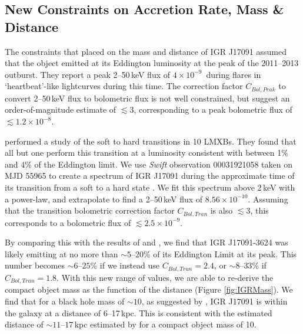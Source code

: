 \subsection{New Constraints on Accretion Rate, Mass \& Distance}
\label{sec:newmass}

\par The constraints that \citealp{Altamirano_IGR_FH} placed on the mass and distance of IGR J17091 assumed that the object emitted at its Eddington luminosity at the peak of the 2011--2013 outburst.  They report a peak 2--50\,keV flux of $4\times10^{-9}$\ergf\ during flares in `heartbeat'-like lightcurves during this time.  The correction factor $C_{Bol,Peak}$ to convert 2--50\,keV flux to bolometric flux is not well constrained, but \citealp{Altamirano_IGR_FH} suggest an order-of-magnitude estimate of $\lesssim3$, corresponding to a peak bolometric flux of $\lesssim1.2\times10^{-8}$\ergf .
\par \citealp{Maccarone_2pct} performed a study of the soft to hard transitions in 10 LMXBs.  They found that all but one perform this transition at a luminosity consistent with between 1\% and 4\% of the Eddington limit.  We use \textit{Swift} observation 00031921058 taken on MJD 55965 to create a spectrum of IGR J17091 during the approximate time of its transition from a soft to a hard state \citep{Drave_Return}.  We fit this spectrum above 2\,keV with a power-law, and extrapolate to find a 2--50\,keV flux of $8.56\times10^{-10}$\ergf .  Assuming that the transition bolometric correction factor $C_{Bol,Tran}$ is also $\lesssim3$, this corresponds to a bolometric flux of $\lesssim2.5\times10^{-9}$\ergf .
\par By comparing this with the results of \citealp{Maccarone_2pct} and \citealp{Altamirano_IGR_FH}, we find that IGR J17091-3624 was likely emitting at no more than $\sim5$--20\% of its Eddington Limit at its peak.  This number becomes $\sim6\mbox{--}25$\% if we instead use $C_{Bol,Tran}=2.4$, or $\sim8\mbox{--}33$\% if $C_{Bol,Tran}=1.8$.  With this new range of values, we are able to re-derive the compact object mass as the function of the distance (Figure \ref{fig:IGRMass}).  We find that for a black hole mass of $\sim10$\ms , as suggested by \citealp{Iyer_Bayes}, IGR J17091 is within the galaxy at a distance of 6--17\,kpc.  This is consistent with the estimated distance of $\sim11\mbox{--}17$\,kpc estimated by \citealp{Rodriguez_D} for a compact object mass of 10\ms .

